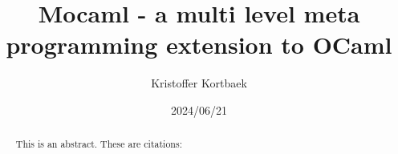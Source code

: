 \documentclass[a4paper, 12pt]{article}
\title{Mocaml - a multi level meta programming extension to OCaml}
\author{Kristoffer Kortbaek}
\date{2024/06/21}
\begin{document}
\maketitle

\begin{abstract}
  This is an abstract.
  These are citations: \cite{metaML}\cite{metaOCaml}\cite{two-stage}\cite{multilevel}
\end{abstract}

\tableofcontents







\end{document}
